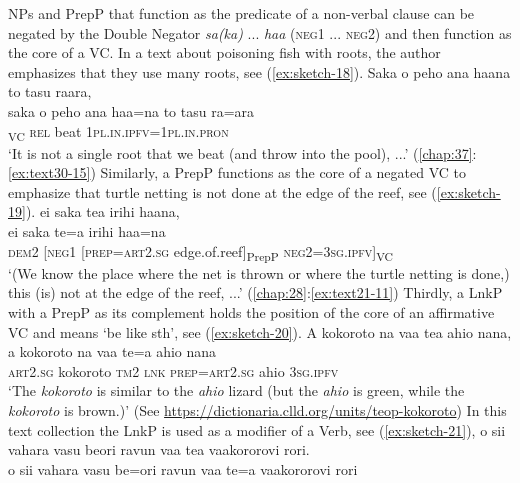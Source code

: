 \documentclass[output=paper]{langscibook}
\begin{document}
NPs and PrepP that function as the predicate of a non-verbal clause can be negated by the Double Negator \textit{sa(ka)} ... \textit{haa} (\textsc{neg}1 ... \textsc{neg}2) and then function as the core of a VC. In a text about poisoning fish with roots, the author emphasizes that they use many roots, see (\ref{ex:sketch-18}).
\ea\label{ex:sketch-18}
Saka o peho ana haana to tasu raara,\\
\gll saka	o	peho	ana	haa=na	to	tasu	ra=ara\\
     [\textsc{neg}1	\textsc{art}3.\textsc{sg}	one3.\textsc{sg}	root	\textsc{neg}=3\textsc{sg}.\textsc{ipfv}]\textsubscript{VC}	\textsc{rel}	beat	1\textsc{pl}.\textsc{in}.\textsc{ipfv}=1\textsc{pl}.\textsc{in}.\textsc{pron}\\
\glt `It is not a single root that we beat (and throw into the pool), ...' (\ref{chap:37}:\ref{ex:text30-15})
\z
Similarly, a PrepP functions as the core of a negated VC to emphasize that turtle netting is not done at the edge of the reef, see (\ref{ex:sketch-19}).
\ea\label{ex:sketch-19}
ei saka tea irihi haana,\\
\gll ei	saka	te=a	irihi	haa=na\\
     \textsc{dem}2	[\textsc{neg}1	[\textsc{prep}=\textsc{art}2.\textsc{sg}	edge.of.reef]\textsubscript{PrepP}	\textsc{neg}2=3\textsc{sg}.\textsc{ipfv}]\textsubscript{VC}\\
\glt `(We know the place where the net is thrown or where the turtle netting is done,) this (is) not at the edge of the reef, ...' (\ref{chap:28}:\ref{ex:text21-11})
\z
Thirdly, a LnkP with a PrepP as its complement holds the position of the core of an affirmative VC and means `be like sth', see (\ref{ex:sketch-20}).
\ea\label{ex:sketch-20}
A kokoroto na vaa tea ahio nana,\\
\gll a kokoroto na vaa te=a ahio nana\\
    \textsc{art}2.\textsc{sg} kokoroto \textsc{tm}2 \textsc{lnk} \textsc{prep}=\textsc{art}2.\textsc{sg}	ahio 3\textsc{sg}.\textsc{ipfv}\\
    \glt `The \textit{kokoroto} is similar to the \textit{ahio} lizard (but the \textit{ahio} is green, while the \textit{kokoroto} is brown.)' (See \url{https://dictionaria.clld.org/units/teop-kokoroto})
\z
In this text collection the LnkP is used as a modifier of a Verb, see (\ref{ex:sketch-21}),
\ea\label{ex:sketch-21}
o sii vahara vasu beori ravun vaa tea vaakororovi rori.\\
\gll o	sii	vahara	vasu	be=ori	ravun	vaa	te=a	vaakororovi	rori\\
\end{document}
